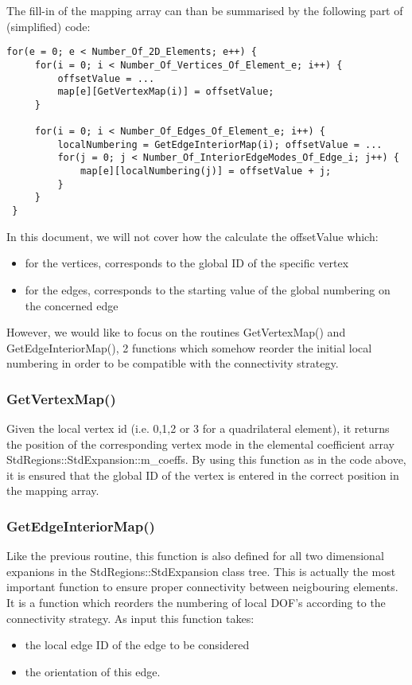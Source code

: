 The fill-in of the mapping array can than be summarised by the following part of
(simplified) code:
\begin{lstlisting}[style=C++Style]
 for(e = 0; e < Number_Of_2D_Elements; e++) {
     for(i = 0; i < Number_Of_Vertices_Of_Element_e; i++) {
         offsetValue = ...
         map[e][GetVertexMap(i)] = offsetValue;
     }

     for(i = 0; i < Number_Of_Edges_Of_Element_e; i++) {
         localNumbering = GetEdgeInteriorMap(i); offsetValue = ...
         for(j = 0; j < Number_Of_InteriorEdgeModes_Of_Edge_i; j++) {
             map[e][localNumbering(j)] = offsetValue + j;
         }
     }
 }
\end{lstlisting}

In this document, we will not cover how the calculate the offsetValue which:
\begin{itemize}
\item for the vertices, corresponds to the global ID of the specific vertex
\item for the edges, corresponds to the starting value of the global numbering on the
 concerned edge
\end{itemize}

However, we would like to focus on the routines GetVertexMap() and
GetEdgeInteriorMap(), 2 functions which somehow reorder the initial local
numbering in order to be compatible with the connectivity strategy.

\subsubsection{GetVertexMap()}

Given the local vertex id (i.e. 0,1,2 or 3 for a quadrilateral element), it
returns the position of the corresponding vertex mode in the elemental
coefficient array StdRegions::StdExpansion::m\_coeffs. By using this function as
in the code above, it is ensured that the global ID of the vertex is entered in
the correct position in the mapping array.

\subsubsection{GetEdgeInteriorMap()}

Like the previous routine, this function is also defined for all two dimensional
expanions in the StdRegions::StdExpansion class tree. This is actually the most
important function to ensure proper connectivity between neigbouring elements.
It is a function which reorders the numbering of local DOF's according to the
connectivity strategy. As input this function takes:
\begin{itemize}
\item the local edge ID of the edge to be considered
\item the orientation of this edge.
\end{itemize}

